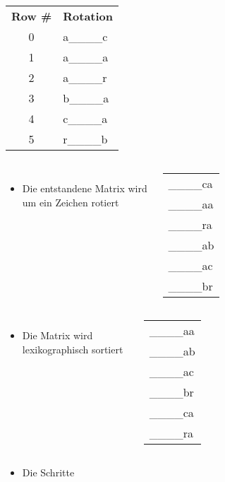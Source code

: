 \documentclass[14pt,xcolor=dvipsnames,pdftex]{beamer}
\begin{document}
\begin{frame}[allowframebreaks]
\begin{columns}[c,onlytextwidth]
    \begin{tabular}{c|l}
    \textbf{Row \#} & \textbf{Rotation} \\
    0 & {\color{darkgreen}a}\_\_\_\_c\\
    1 & {\color{darkgreen}a}\_\_\_\_a\\
    2 & {\color{darkgreen}a}\_\_\_\_r\\
    3 & {\color{darkgreen}b}\_\_\_\_a\\
    4 & {\color{darkgreen}c}\_\_\_\_a\\
    5 & {\color{darkgreen}r}\_\_\_\_b\\
    \end{tabular}
\end{columns}
\framebreak
\begin{columns}[c,onlytextwidth]
 \begin{itemize}
  \item Die entstandene Matrix wird um ein Zeichen rotiert
 \end{itemize}
 \begin{tabular}{T}
    \_\_\_\_c{\color{darkgreen}a}\\
    \_\_\_\_a{\color{darkgreen}a}\\
    \_\_\_\_r{\color{darkgreen}a}\\
    \_\_\_\_a{\color{darkgreen}b}\\
    \_\_\_\_a{\color{darkgreen}c}\\
    \_\_\_\_b{\color{darkgreen}r}
  \end{tabular}
\end{columns}
\framebreak
\begin{columns}[c,onlytextwidth]
 \begin{itemize}
  \item Die Matrix wird lexikographisch sortiert
 \end{itemize}
 \begin{tabular}{T}
    \_\_\_\_aa\\
    \_\_\_\_ab\\
    \_\_\_\_ac\\
    \_\_\_\_br\\
    \_\_\_\_ca\\
    \_\_\_\_ra
  \end{tabular}
\end{columns}
\framebreak
\begin{itemize}
 \item Die Schritte

\end{itemize}
\end{frame}
\end{document}
